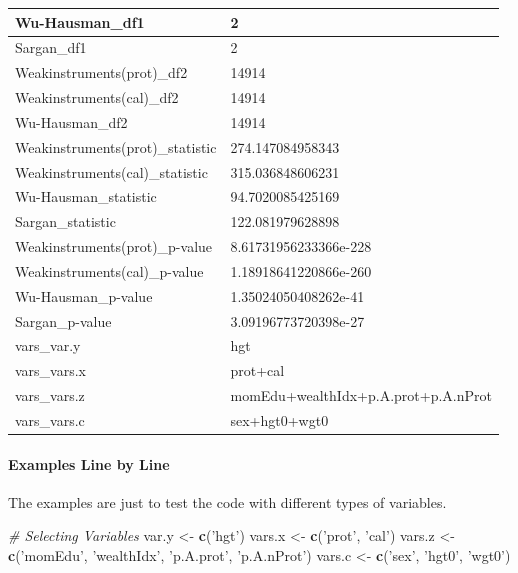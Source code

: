\documentclass[
]{book}
\newenvironment{Shaded}{\begin{snugshade}}{\end{snugshade}}
\newcommand{\CommentTok}[1]{\textcolor[rgb]{0.56,0.35,0.01}{\textit{#1}}}
\newcommand{\KeywordTok}[1]{\textcolor[rgb]{0.13,0.29,0.53}{\textbf{#1}}}
\newcommand{\NormalTok}[1]{#1}
\newcommand{\StringTok}[1]{\textcolor[rgb]{0.31,0.60,0.02}{#1}}
\begin{document}
\begin{table}[!h]
\begin{tabular}{l|l}
\hline
\rowcolor{gray!6}  Wu-Hausman\_df1 & 2\\
\hline
Sargan\_df1 & 2\\
\hline
\rowcolor{gray!6}  Weakinstruments(prot)\_df2 & 14914\\
\hline
Weakinstruments(cal)\_df2 & 14914\\
\hline
\rowcolor{gray!6}  Wu-Hausman\_df2 & 14914\\
\hline
Weakinstruments(prot)\_statistic & 274.147084958343\\
\hline
\rowcolor{gray!6}  Weakinstruments(cal)\_statistic & 315.036848606231\\
\hline
Wu-Hausman\_statistic & 94.7020085425169\\
\hline
\rowcolor{gray!6}  Sargan\_statistic & 122.081979628898\\
\hline
Weakinstruments(prot)\_p-value & 8.61731956233366e-228\\
\hline
\rowcolor{gray!6}  Weakinstruments(cal)\_p-value & 1.18918641220866e-260\\
\hline
Wu-Hausman\_p-value & 1.35024050408262e-41\\
\hline
\rowcolor{gray!6}  Sargan\_p-value & 3.09196773720398e-27\\
\hline
vars\_var.y & hgt\\
\hline
\rowcolor{gray!6}  vars\_vars.x & prot+cal\\
\hline
vars\_vars.z & momEdu+wealthIdx+p.A.prot+p.A.nProt\\
\hline
\rowcolor{gray!6}  vars\_vars.c & sex+hgt0+wgt0\\
\hline
\end{tabular}
\end{table}

\hypertarget{examples-line-by-line}{%
\paragraph{Examples Line by Line}\label{examples-line-by-line}}

The examples are just to test the code with different types of variables.

\begin{Shaded}
\begin{Highlighting}[]
\CommentTok{# Selecting Variables}
\NormalTok{var.y <-}\StringTok{ }\KeywordTok{c}\NormalTok{(}\StringTok{'hgt'}\NormalTok{)}
\NormalTok{vars.x <-}\StringTok{ }\KeywordTok{c}\NormalTok{(}\StringTok{'prot'}\NormalTok{, }\StringTok{'cal'}\NormalTok{)}
\NormalTok{vars.z <-}\StringTok{ }\KeywordTok{c}\NormalTok{(}\StringTok{'momEdu'}\NormalTok{, }\StringTok{'wealthIdx'}\NormalTok{, }\StringTok{'p.A.prot'}\NormalTok{, }\StringTok{'p.A.nProt'}\NormalTok{)}
\NormalTok{vars.c <-}\StringTok{ }\KeywordTok{c}\NormalTok{(}\StringTok{'sex'}\NormalTok{, }\StringTok{'hgt0'}\NormalTok{, }\StringTok{'wgt0'}\NormalTok{)}
\end{Highlighting}
\end{Shaded}
\end{document}
